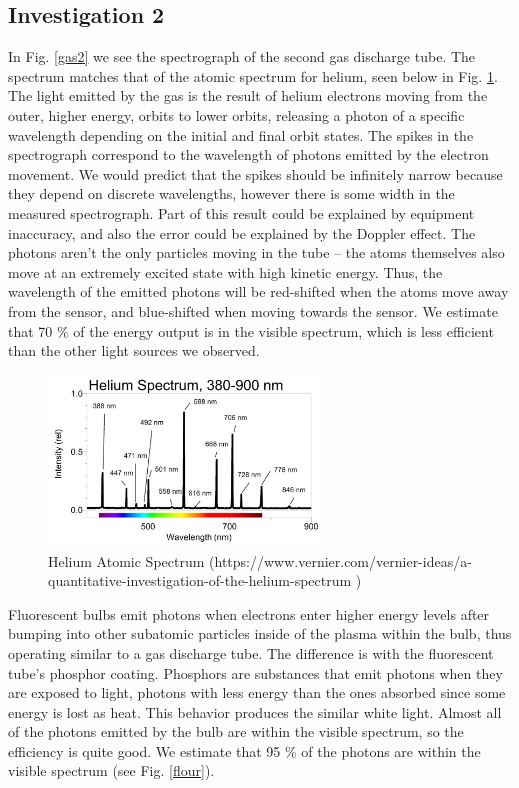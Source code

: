 \documentclass{article}[12pt]
\renewcommand{\figurename}{Fig. }
\begin{document}
\subsection{Investigation 2}

In \figurename \ref{gas2} we see the spectrograph of the second gas discharge tube.
The spectrum matches that of the atomic spectrum for helium, seen below in \figurename \ref{helum_spectrum}.
The light emitted by the gas is the result of helium electrons moving from the outer, higher energy, orbits to lower orbits, releasing a photon of a specific wavelength depending on the initial and final orbit states.
The spikes in the spectrograph correspond to the wavelength of photons emitted by the electron movement.
We would predict that the spikes should be infinitely narrow because they depend on discrete wavelengths, however there is some width in the measured spectrograph.
Part of this result could be explained by equipment inaccuracy, and also the error could be explained by the Doppler effect.
The photons aren't the only particles moving in the tube -- the atoms themselves also move at an extremely excited state with high kinetic energy.
Thus, the wavelength of the emitted photons will be red-shifted when the atoms move away from the sensor, and blue-shifted when moving towards the sensor.
We estimate that 70 \% of the energy output is in the visible spectrum, which is less efficient than the other light sources we observed.

\begin{figure} [H]
  \center
  \includegraphics[width=0.65\textwidth]{figures/helium_spectra.jpeg}
  \caption{Helium Atomic Spectrum ({\tiny https://www.vernier.com/vernier-ideas/a-quantitative-investigation-of-the-helium-spectrum} )}
  \label{helum_spectrum}
\end{figure}

Fluorescent bulbs emit photons when electrons enter higher energy levels after bumping into other subatomic particles inside of the plasma within the bulb, thus operating similar to a gas discharge tube.
The difference is with the fluorescent tube's phosphor coating. 
Phosphors are substances that emit photons when they are exposed to light, photons with less energy than the ones absorbed since some energy is lost as heat.
This behavior produces the similar white light.
Almost all of the photons emitted by the bulb are within the visible spectrum, so the efficiency is quite good.
We estimate that 95 \% of the photons are within the visible spectrum (see \figurename \ref{flour}).
\end{document}
